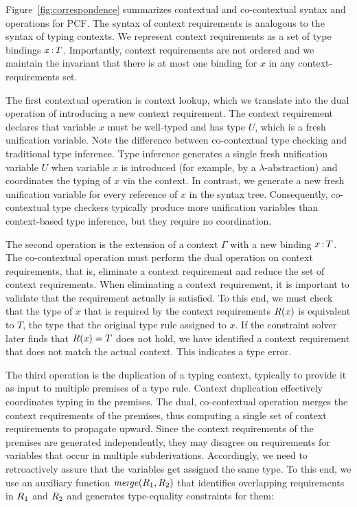 \documentclass{llncs}
\begin{document}
Figure~\ref{fig:correspondence} summarizes contextual and co-contextual syntax
and operations for PCF. The syntax of context requirements is analogous to the
syntax of typing contexts. We represent context requirements as a set of type
bindings $x \mathop{:} T$. Importantly, context requirements are not ordered and we
maintain the invariant that there is at most one binding for $x$ in any
context-requirements set.

The first contextual operation is context lookup, which we translate into the
dual operation of introducing a new context requirement. The context requirement
declares that variable $x$ must be well-typed and has type $U$, which is a fresh
unification variable. 
Note the difference between co-contextual type checking and traditional type inference.
Type inference generates a single fresh unification variable $U$ when variable $x$ is introduced (for
example, by a $\lambda$-abstraction) and coordinates the typing of $x$ via the
context. In contrast, we generate a new fresh unification variable for every reference of
$x$ in the syntax tree. Consequently, co-contextual type checkers typically
produce more unification variables than context-based type inference, but they
require no coordination.

The second operation is the extension of a context $\Gamma$ with a new binding
$x \mathop{:} T$. The co-contextual operation must perform the dual operation on
context requirements, that is, eliminate a context requirement and reduce the
set of context requirements. When eliminating a context requirement, it is
important to validate that the requirement actually is satisfied. To this end,
we must check that the type of $x$ that is required by the context requirements
$R(x)$ is equivalent to $T$, the type that the original type rule assigned
to $x$. If the constraint solver later finds that $R(x) = T$ does not hold, we have identified a context
requirement that does not match the actual context. This indicates a type error.


The third operation is the duplication of a typing context, typically to provide
it as input to multiple premises of a type rule. Context duplication effectively
coordinates typing in the premises. The dual, co-contextual operation merges the
context requirements of the premises, thus computing a single set of context
requirements to propagate upward. Since the context requirements of the premises
are generated independently, they may disagree on requirements for variables
that occur in multiple subderivations. Accordingly, we need to retroactively
assure that the variables get assigned the same type. To this end, we use an
auxiliary function $\mathit{merge}(R_1, R_2)$ that identifies overlapping
requirements in $R_1$ and $R_2$ and generates type-equality constraints
for them:
\end{document}
